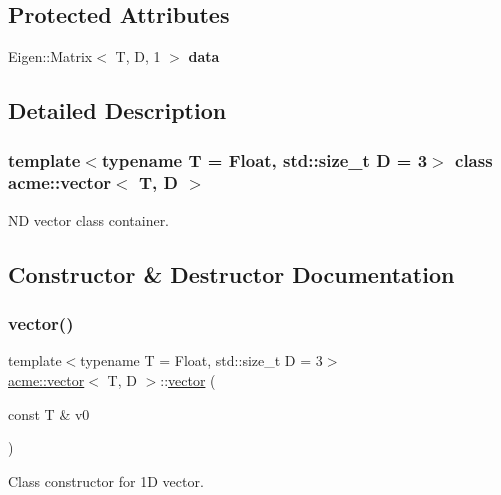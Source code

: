 \subsection*{Protected Attributes}
\begin{DoxyCompactItemize}
\item 
\mbox{\label{classacme_1_1point_a7532a61c7031fddbef1ea217cd916c4c}} 
Eigen\+::\+Matrix$<$ T, D, 1 $>$ {\bfseries data}
\end{DoxyCompactItemize}


\subsection{Detailed Description}
\subsubsection*{template$<$typename T = Float, std\+::size\+\_\+t D = 3$>$\newline
class acme\+::vector$<$ T, D $>$}

ND vector class container. 

\subsection{Constructor \& Destructor Documentation}
\mbox{\label{classacme_1_1vector_aa29b7e609acdb3ed9485a3c8864f2b5c}} 
\subsubsection{\texorpdfstring{vector()}{vector()}\hspace{0.1cm}{\footnotesize\ttfamily [1/5]}}
{\footnotesize\ttfamily template$<$typename T = Float, std\+::size\+\_\+t D = 3$>$ \\
\hyperlink{classacme_1_1vector}{acme\+::vector}$<$ T, D $>$\+::\hyperlink{classacme_1_1vector}{vector} (\begin{DoxyParamCaption}\item[{const T \&}]{v0 }\end{DoxyParamCaption})\hspace{0.3cm}{\ttfamily [inline]}}



Class constructor for 1D vector. 


